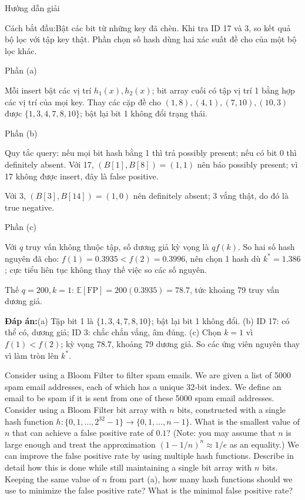 \documentclass[10pt,a4paper,twocolumn]{article}
\makeatletter
\newcommand{\maptag}[1]{\phantomsection\@bsphack\protected@write\@auxout{}{\string\newlabel{#1}{{}{\thepage}{}{\@currentHref}{}}}\@esphack}
\newcommand{\key}[1]{#1:\enspace}
\newcommand{\solutionprompt}[1]{\par\addvspace{1pt}\noindent\key{Cách bắt đầu}#1\par\addvspace{2pt}}
\newcommand{\blocklabel}[1]{\par\noindent#1\par\nobreak}
\newcommand{\answer}[1]{%
  \par\addvspace{3pt}%
  \blocklabel{#1Hướng dẫn giải}}
\newcommand{\finalanswer}[1]{%
  \par\addvspace{3pt}\noindent\textbf{Đáp án:}\nobreak\enspace#1\par}
\newcommand{\guidepart}[1]{%
  \par\addvspace{1.5pt}%
  \blocklabel{Phần #1}}
\makeatother
\begin{document}
\answer{\maptag{answer:Pr23}}
\solutionprompt{Bật các bit từ những key đã chèn. Khi tra ID 17 và 3, so kết quả bộ lọc với tập key thật. Phần chọn số hash dùng hai xác suất đề cho của một bộ lọc khác.}
\guidepart{(a)}
\begin{guidesteps}
\item Mỗi insert bật các vị trí $h_1(x),h_2(x)$; bit array cuối có tập vị trí 1 bằng hợp các vị trí của mọi key. Thay các cặp đề cho $(1,8),(4,1),(7,10),(10,3)$ được $\{1,3,4,7,8,10\}$; bật lại bit 1 không đổi trạng thái.
\end{guidesteps}
\guidepart{(b)}
\begin{guidesteps}
\item Quy tắc query: nếu mọi bit hash bằng 1 thì trả possibly present; nếu có bit 0 thì definitely absent. Với 17, $(B[1],B[8])=(1,1)$ nên báo possibly present; vì 17 không được insert, đây là false positive.
\item Với 3, $(B[3],B[14])=(1,0)$ nên definitely absent; 3 vắng thật, do đó là true negative.
\end{guidesteps}
\guidepart{(c)}
\begin{guidesteps}
\item Với $q$ truy vấn không thuộc tập, số dương giả kỳ vọng là $q f(k)$. So hai số hash nguyên đã cho: $f(1)=0.3935<f(2)=0.3996$, nên chọn 1 hash dù $k^*=1.386$; cực tiểu liên tục không thay thế việc so các số nguyên.
\item Thế $q=200,k=1$: $\mathbb E[\mathrm{FP}]=200(0.3935)=78.7$, tức khoảng 79 truy vấn dương giả.
\end{guidesteps}
\finalanswer{(a) Tập bit 1 là $\{1,3,4,7,8,10\}$; bật lại bit 1 không đổi. (b) ID 17: có thể có, dương giả; ID 3: chắc chắn vắng, âm đúng. (c) Chọn $k=1$ vì $f(1)<f(2)$; kỳ vọng $78.7$, khoảng 79 dương giả. So các ứng viên nguyên thay vì làm tròn lên $k^*$.}

Consider using a Bloom Filter to filter spam emails. We are given a list of 5000 spam email addresses, each of which has a unique 32-bit index. We define an email to be spam if it is sent from one of these 5000 spam email addresses.
 Consider using a Bloom Filter bit array with $n$ bits, constructed with a single hash function $h:\{0,1,\ldots,2^{32}-1\}\to\{0,1,\ldots,n-1\}$. What is the smallest value of $n$ that can achieve a false positive rate of $0.1$? (Note: you may assume that $n$ is large enough and treat the approximation $(1-1/n)^n\approx1/e$ as an equality.)
 We can improve the false positive rate by using multiple hash functions. Describe in detail how this is done while still maintaining a single bit array with $n$ bits.
 Keeping the same value of $n$ from part (a), how many hash functions should we use to minimize the false positive rate? What is the minimal false positive rate?
\end{document}
